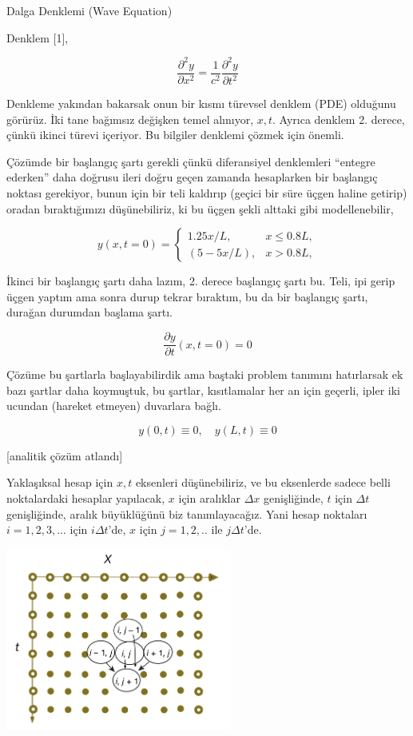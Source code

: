 \documentclass[12pt,fleqn]{article}\usepackage{../../common}
\begin{document}
Dalga Denklemi (Wave Equation)

Denklem [1],

$$
\frac{\partial^2 y}{\partial x^2}  =
\frac{1}{c^2}\frac{\partial^2 y}{\partial t^2}
$$

Denkleme yakından bakarsak onun bir kısmı türevsel denklem (PDE) olduğunu
görürüz. İki tane bağımsız değişken temel alınıyor, $x,t$. Ayrıca denklem
2. derece, çünkü ikinci türevi içeriyor. Bu bilgiler denklemi çözmek için
önemli.

Çözümde bir başlangıç şartı gerekli çünkü diferansiyel denklemleri ``entegre
ederken'' daha doğrusu ileri doğru geçen zamanda hesaplarken bir başlangıç
noktası gerekiyor, bunun için bir teli kaldırıp (geçici bir süre üçgen haline
getirip) oradan bıraktığımızı düşünebiliriz, ki bu üçgen şekli alttaki gibi
modellenebilir,

$$
y(x,t=0)=\begin{cases}
1.25 x/L , &x\leq 0.8 L ,\\
(5-5x/L), &x> 0.8 L,
\end{cases} 
$$

İkinci bir başlangıç şartı daha lazım, 2. derece başlangıç şartı bu. Teli, ipi
gerip üçgen yaptım ama sonra durup tekrar bıraktım, bu da bir başlangıç şartı,
durağan durumdan başlama şartı.

$$
\frac{\partial y} {\partial t}(x,t=0) =0
$$

Çözüme bu şartlarla başlayabilirdik ama baştaki problem tanımını hatırlarsak ek
bazı şartlar daha koymuştuk, bu şartlar, kısıtlamalar her an için geçerli,
ipler iki ucundan (hareket etmeyen) duvarlara bağlı.

$$
y(0,t) \equiv 0, \quad y(L,t) \equiv 0
$$

[analitik çözüm atlandı]

Yaklaşıksal hesap için $x,t$ eksenleri düşünebiliriz, ve bu eksenlerde
sadece belli noktalardaki hesaplar yapılacak, $x$ için aralıklar $\Delta x$
genişliğinde, $t$ için $\Delta t$ genişliğinde, aralık büyüklüğünü biz
tanımlayacağız. Yani hesap noktaları $i=1,2,3,...$ için $i \Delta t$'de,
$x$ için $j=1,2,..$ ile $j \Delta t$'de.

\includegraphics[width=20em]{compscieng_app17wave_03.png}
\end{document}

